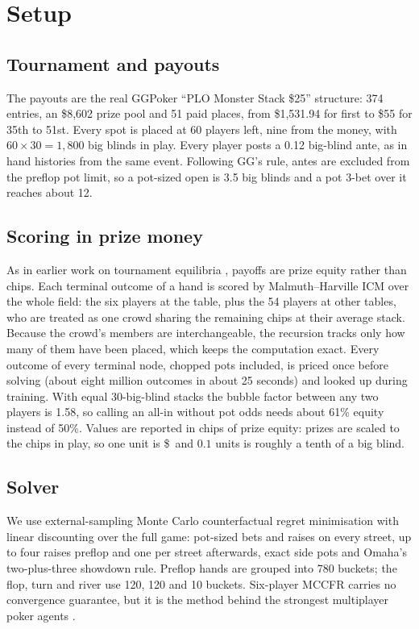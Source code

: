 \documentclass[10pt]{article}
\begin{document}
\section{Setup}
\subsection{Tournament and payouts}
The payouts are the real GGPoker ``PLO Monster Stack \$25'' structure: 374 entries, an \$8{,}602
prize pool and 51 paid places, from \$1{,}531.94 for first to \$55 for 35th to 51st. Every spot is
placed at 60 players left, nine from the money, with $60 \times 30 = 1{,}800$ big blinds in play.
Every player posts a 0.12 big-blind ante, as in hand histories from the same event. Following GG's
rule, antes are excluded from the preflop pot limit, so a pot-sized open is 3.5 big blinds and a
pot 3-bet over it reaches about 12.

\subsection{Scoring in prize money}
As in earlier work on tournament equilibria \cite{ganzfried}, payoffs are prize equity rather than
chips. Each terminal outcome of a hand is scored by Malmuth--Harville ICM \cite{harville} over the
whole field: the six players at the table, plus the 54 players at other tables, who are treated as one
crowd sharing the remaining chips at their average stack. Because the crowd's members are
interchangeable, the recursion tracks only how many of them have been placed, which keeps the
computation exact. Every outcome of every terminal node, chopped pots included, is priced once before
solving (about eight million outcomes in about 25 seconds) and looked up during training. With equal
30-big-blind stacks the bubble factor between any two players is 1.58, so calling an all-in without
pot odds needs about 61\% equity instead of 50\%. Values are reported in chips of prize equity:
prizes are scaled to the chips in play, so one unit is \$\DollarsPerUnit\ and $0.1$ units is roughly
a tenth of a big blind.

\subsection{Solver}
We use external-sampling Monte Carlo counterfactual regret minimisation \cite{lanctot} with linear
discounting over the full game: pot-sized bets and raises on every street, up to four raises preflop
and one per street afterwards, exact side pots and Omaha's two-plus-three showdown rule. Preflop hands
are grouped into 780 buckets; the flop, turn and river use 120, 120 and 10 buckets. Six-player
MCCFR carries no convergence guarantee, but it is the method behind the strongest multiplayer poker
agents \cite{pluribus}.
\end{document}
